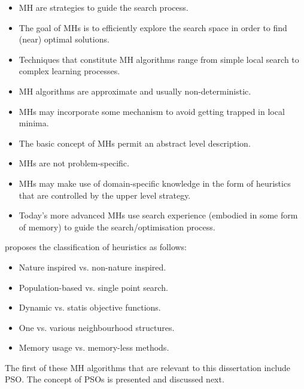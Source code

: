 \begin{itemize}
      \item \ac{MH} are strategies to guide the search process.

      \item The goal of \acp{MH} is to efficiently explore the search space in order to find (near) optimal solutions.

      \item Techniques that constitute \ac{MH} algorithms range from simple local search to complex learning processes.

      \item \ac{MH} algorithms are approximate and usually non-deterministic.

      \item \acp{MH} may incorporate some mechanism to avoid getting trapped in local minima.

      \item The basic concept of \acp{MH} permit an abstract level description.

      \item \acp{MH} are not problem-specific.

      \item \acp{MH} may make use of domain-specific knowledge  in the form of heuristics that are controlled by the upper level strategy.

      \item Today's more advanced \acp{MH} use search experience (embodied in some form of memory) to guide the search/optimisation process.
\end{itemize}

\citeauthor{ref:blum:2003} \cite{ref:blum:2003} proposes the classification of heuristics as follows:

\begin{itemize}
      \item Nature inspired vs. non-nature inspired.
      \item Population-based vs. single point search.
      \item Dynamic vs. statis objective functions.
      \item One vs. various neighbourhood structures.
      \item Memory usage vs. memory-less methods.
\end{itemize}

The first of these \ac{MH} algorithms that are relevant to this dissertation include \ac{PSO}. The concept of \acp{PSO} is presented and discussed next.


